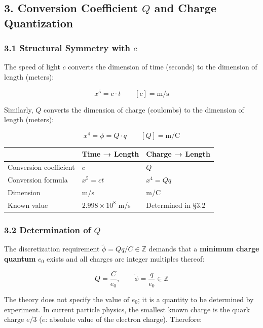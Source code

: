 \documentclass[a4paper,11pt]{article}
\theoremstyle{definition}
\begin{document}
\subsection{\texorpdfstring{3. Conversion Coefficient \(Q\) and Charge Quantization}{3. Conversion Coefficient Q and Charge Quantization}}\label{conversion-coefficient-q-and-charge-quantization}

\subsubsection{\texorpdfstring{3.1 Structural Symmetry with \(c\)}{3.1 Structural Symmetry with c}}\label{structural-symmetry-with-c}

The speed of light \(c\) converts the dimension of time (seconds) to the dimension of length (meters):

\[x^5 = c \cdot t \qquad [c] = \text{m/s} \tag{3.1}\]

Similarly, \(Q\) converts the dimension of charge (coulombs) to the dimension of length (meters):

\[x^4 = \phi = Q \cdot q \qquad [Q] = \text{m/C} \tag{3.2}\]

{\def\LTcaptype{none} %
\begin{longtable}[]{@{}lll@{}}
\toprule\noalign{}
& Time → Length & Charge → Length \\
\midrule\noalign{}
\endhead
\bottomrule\noalign{}
\endlastfoot
Conversion coefficient & \(c\) & \(Q\) \\
Conversion formula & \(x^5 = ct\) & \(x^4 = Qq\) \\
Dimension & m/s & m/C \\
Known value & \(2.998 \times 10^8\) m/s & Determined in §3.2 \\
\end{longtable}
}

\subsubsection{\texorpdfstring{3.2 Determination of \(Q\)}{3.2 Determination of Q}}\label{determination-of-q}

The discretization requirement \(\tilde{\phi} = Qq/C \in \mathbb{Z}\) demands that a \textbf{minimum charge quantum} \(e_0\) exists and all charges are integer multiples thereof:

\[Q = \frac{C}{e_0}, \qquad \tilde{\phi} = \frac{q}{e_0} \in \mathbb{Z} \tag{3.3}\]

The theory does not specify the value of \(e_0\); it is a quantity to be determined by experiment. In current particle physics, the smallest known charge is the quark charge \(e/3\) (\(e\): absolute value of the electron charge). Therefore:
\end{document}
